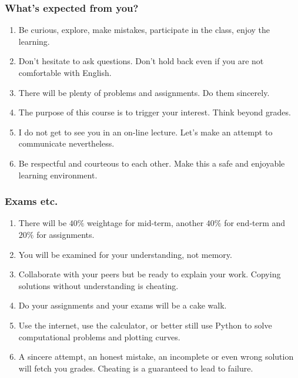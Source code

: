 \documentclass{beamer}
\begin{document}
\begin{frame}
\frametitle{What's expected from you?}
\begin{enumerate}
\item Be curious, explore, make mistakes, participate in the class, enjoy the 
learning.
\item Don't hesitate to ask questions. Don't hold back even if you are not 
comfortable with English.
\item There will be plenty of problems and assignments. Do them sincerely.
\item The purpose of this course is to trigger your interest. Think beyond
grades.
\item I do not get to see you in an on-line lecture. Let's make an attempt to 
communicate nevertheless.
\item Be respectful and courteous to each other. Make this a safe and enjoyable
learning environment.
\end{enumerate}
\end{frame}

\begin{frame}
\frametitle{Exams etc.}
\begin{enumerate}
\item There will be $40\%$ weightage for mid-term, another $40\%$ for end-term
and $20\%$ for assignments.
\item You will be examined for your understanding, not memory. 
\item Collaborate with your peers but be ready to explain your work. Copying
solutions without understanding is cheating.
\item Do your assignments and your exams will be a cake walk.
\item Use the internet, use the calculator, or better still use Python to solve
computational problems and plotting curves.
\item A sincere attempt, an honest mistake, an incomplete or even wrong solution
will fetch you grades. Cheating is a guaranteed to lead to failure.
\end{enumerate}
\end{frame}
\end{document}
